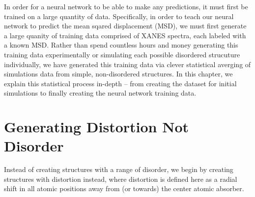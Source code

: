 
In order for a neural network to be able to make any predictions, it must first be trained on a large quantity of data. Specifically, in order to teach our neural network to predict the mean sqared displacement (MSD), we must first generate a large quanity of training data comprised of XANES spectra, each labeled with a known MSD. Rather than spend countless hours and money generating this training data experimentally or simulating each possible disordered strucuture individually, we have generated this training data via clever statistical averging of simulations data from simple, non-disordered structures. In this chapter, we explain this statistical process in-depth -- from creating the dataset for initial simulations to finally creating the neural network training data.

\section{Generating Distortion Not Disorder}
Instead of creating structures with a range of disorder, we begin by creating structures with distortion instead, where distortion is defined here as a radial shift in all atomic positions away from (or towards) the center atomic absorber.